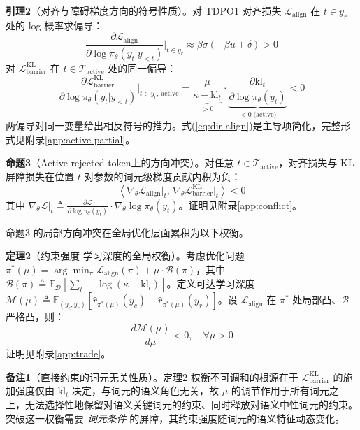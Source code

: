 \documentclass[lettersize,journal]{IEEEtran}
\begin{document}
\textbf{引理2}（对齐与障碍梯度方向的符号性质）。对 TDPO1 对齐损失 $\mathcal{L}_{\text{align}}$ 在 $t \in y_r$ 处的 log-概率求偏导：
\begin{equation}\label{eq:dir-align}
\frac{\partial \mathcal{L}_{\text{align}}}{\partial \log\pi_\theta(y_t|y_{<t})}\bigg|_{t \in y_r} \approx \beta \sigma\!\left(-\beta u + \delta\right) > 0
\end{equation}
对 $\mathcal{L}^{\text{KL}}_{\text{barrier}}$ 在 $t \in \mathcal{T}_{\text{active}}$ 处的同一偏导：
\begin{equation}\label{eq:dir-barrier}
\frac{\partial \mathcal{L}^{\text{KL}}_{\text{barrier}}}{\partial \log\pi_\theta(y_t|y_{<t})}\bigg|_{t \in y_r,\,\text{active}} = \underbrace{\frac{\mu}{\kappa - \text{kl}_t}}_{> 0} \cdot \underbrace{\frac{\partial \text{kl}_t}{\partial \log\pi_\theta(y_t)}}_{< 0\;\text{(active)}} < 0
\end{equation}
两偏导对同一变量给出相反符号的推力。式(\ref{eq:dir-align})是主导项简化，完整形式见附录\ref{app:active-partial}。

\textbf{命题3}（Active rejected token上的方向冲突）。对任意 $t \in \mathcal{T}_{\text{active}}$，对齐损失与 KL 屏障损失在位置 $t$ 对参数的词元级梯度贡献内积为负：
\begin{equation}\label{eq:per-token-conflict}
\left\langle \nabla_\theta \mathcal{L}_{\text{align}}\big|_t,\, \nabla_\theta \mathcal{L}^{\text{KL}}_{\text{barrier}}\big|_t \right\rangle < 0
\end{equation}
其中 $\nabla_\theta \mathcal{L}|_t \triangleq \frac{\partial \mathcal{L}}{\partial \log\pi_\theta(y_t)} \cdot \nabla_\theta \log\pi_\theta(y_t)$。证明见附录\ref{app:conflict}。

命题3 的局部方向冲突在全局优化层面累积为以下权衡。

\textbf{定理2}（约束强度-学习深度的全局权衡）。考虑优化问题 $\pi^*(\mu) = \arg\min_\pi \mathcal{L}_{\text{align}}(\pi) + \mu \cdot \mathcal{B}(\pi)$，其中 $\mathcal{B}(\pi) \triangleq \mathbb{E}_{\mathcal{D}}[\sum_t -\log(\kappa - \text{kl}_t)]$。定义可达学习深度 $\mathcal{M}(\mu) \triangleq \mathbb{E}_{(y_c, y_r)}[\hat{r}_{\pi^*(\mu)}(y_c) - \hat{r}_{\pi^*(\mu)}(y_r)]$。设 $\mathcal{L}_{\text{align}}$ 在 $\pi^*$ 处局部凸、$\mathcal{B}$ 严格凸，则：
\begin{equation}\label{eq:trade-result}
\frac{d\mathcal{M}(\mu)}{d\mu} < 0, \quad \forall \mu > 0
\end{equation}
证明见附录\ref{app:trade}。

\textbf{备注1}（直接约束的词元无关性质）。定理2 权衡不可调和的根源在于 $\mathcal{L}^{\text{KL}}_{\text{barrier}}$ 的施加强度仅由 $\text{kl}_t$ 决定，与词元的语义角色无关，故 $\mu$ 的调节作用于所有词元之上，无法选择性地保留对语义关键词元的约束、同时释放对语义中性词元的约束。突破这一权衡需要 \textit{词元条件} 的屏障，其约束强度随词元的语义特征动态变化。
\end{document}
